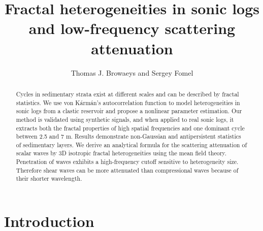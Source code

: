 

%




\title{Fractal heterogeneities in sonic logs\\ and low-frequency scattering attenuation}

\renewcommand{\thefootnote}{\fnsymbol{footnote}} 


\author{Thomas J. Browaeys and Sergey Fomel}

\footer{}

\maketitle




\begin{abstract}
Cycles in sedimentary strata exist at different scales
and can be described by fractal statistics.
We use von K\'arm\'an's autocorrelation function
to model heterogeneities in sonic logs from a clastic reservoir and
propose a nonlinear parameter estimation.
Our method is validated using synthetic signals,
and when applied to real sonic logs, it extracts both
the fractal properties of high spatial frequencies and one dominant cycle between 2.5 and 7 m.
Results demonstrate non-Gaussian and antipersistent statistics of sedimentary layers.
We derive an analytical formula for the scattering attenuation of scalar waves 
by 3D isotropic fractal heterogeneities using the mean field theory.
Penetration of waves exhibits a high-frequency cutoff sensitive to heterogeneity size.
Therefore shear waves can be more attenuated than compressional waves because of their shorter wavelength.
\end{abstract}


\section{Introduction}


